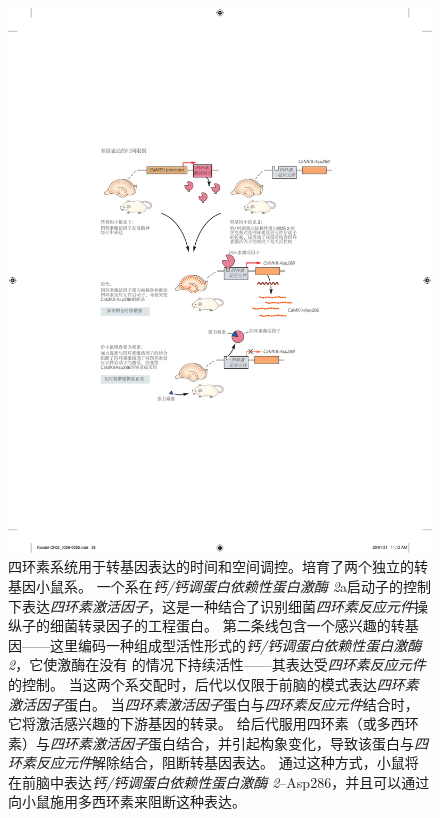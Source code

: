 \begin{figure}[htbp]
	\centering
	\includegraphics[width=0.85\linewidth]{chap02/fig_2_9}
	\caption{四环素系统用于转基因表达的时间和空间调控。培育了两个独立的转基因小鼠系。
		一个系在\textit{钙/钙调蛋白依赖性蛋白激酶 2}a启动子的控制下表达\textit{四环素激活因子}，这是一种结合了识别细菌\textit{四环素反应元件}操纵子的细菌转录因子的工程蛋白。
		第二条线包含一个感兴趣的转基因——这里编码一种组成型活性形式的\textit{钙/钙调蛋白依赖性蛋白激酶 2}，它使激酶在没有 的情况下持续活性——其表达受\textit{四环素反应元件}的控制。
		当这两个系交配时，后代以仅限于前脑的模式表达\textit{四环素激活因子}蛋白。
		当\textit{四环素激活因子}蛋白与\textit{四环素反应元件}结合时，它将激活感兴趣的下游基因的转录。
		给后代服用四环素（或多西环素）与\textit{四环素激活因子}蛋白结合，并引起构象变化，导致该蛋白与\textit{四环素反应元件}解除结合，阻断转基因表达。
		通过这种方式，小鼠将在前脑中表达\textit{钙/钙调蛋白依赖性蛋白激酶 2}–Asp286，并且可以通过向小鼠施用多西环素来阻断这种表达\cite{mayford1996control}。}
	\label{fig:2_9}
\end{figure}


